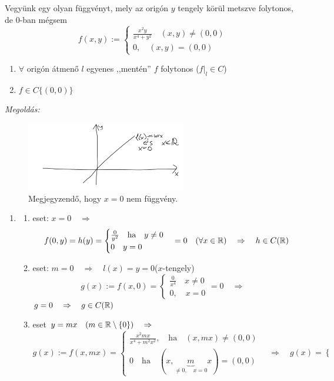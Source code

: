 \documentclass[a4paper,11.5pt]{article}
\begin{document}
	\begin{task}
		Vegyünk egy olyan függvényt, mely az origón $y$ tengely körül metszve folytonos, de 0-ban mégsem
		\[ f(x,y):=\begin{cases}
			\frac{x^2y}{x^4+y^2}\quad (x,y)\not=(0,0)\\
			0,\quad (x,y)=(0,0)
		\end{cases} \]
		\begin{enumerate}
			\item $\forall$ origón átmenő $l$ egyenes ,,mentén'' $f$ folytonos ($f|_l\in C$)
			\item $f\in C\{ (0,0) \}$
		\end{enumerate}
		\textit{Megoldás:}
		\begin{figure}[H]
			\centering
			\includegraphics[height=3cm]{kepek/26.png}
			\caption{Megjegyzendő, hogy $x=0$ nem függvény.}
		\end{figure}
		\begin{enumerate}
			\item\begin{enumerate}
				\item eset: $x=0\quad \Rightarrow\quad $
				\[ f(0,y)=h(y)=\begin{cases}
					\frac{0}{y^2}\quad \text{ha}\quad y\not=0\\
					0\quad y=0
				\end{cases}=0\quad (\forall x\in\mathbb{R})\quad \Rightarrow\quad h\in C(\mathbb{R}) \]
				\item eset: $m=0\quad \Rightarrow\quad l(x)=y=0$\quad ($x$-tengely)
				\[ g(x):=f(x,0)=\begin{cases}
					\frac{0}{x^4}\quad x\not=0\\
					0,\quad x=0
				\end{cases}=0\quad \Rightarrow\quad  \]
				$g=0\quad \Rightarrow\quad g\in C(\mathbb{R})$
				\item eset $y=mx\quad (m\in\mathbb{R}\setminus\{0\})\quad \Rightarrow$
				\[ g(x):=f(x,mx)=\begin{cases}
					\frac{x^2mx}{x^4+m^2x^2},\quad \text{ha}\quad (x,mx)\not=(0,0)\\
					0\quad \text{ha}\quad (x,\underbrace{m}_{\not=0,\quad x=0}x)=(0,0)
				\end{cases}\quad  \Rightarrow\quad g(x)=\begin{cases}

\end{cases}\]
\end{enumerate}
\end{enumerate}
\end{task}
\end{document}

